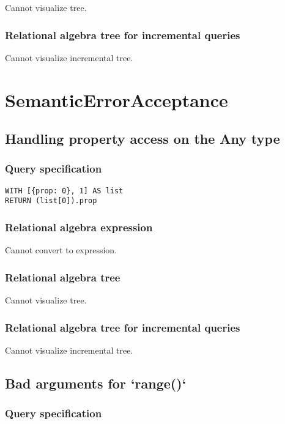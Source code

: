 Cannot visualize tree.

\subsubsection*{Relational algebra tree for incremental queries}

Cannot visualize incremental tree.

\section{SemanticErrorAcceptance}

\subsection{Handling property access on the Any type}

\subsubsection*{Query specification}

\begin{lstlisting}
WITH [{prop: 0}, 1] AS list
RETURN (list[0]).prop
\end{lstlisting}

\subsubsection*{Relational algebra expression}

Cannot convert to expression.

\subsubsection*{Relational algebra tree}

Cannot visualize tree.

\subsubsection*{Relational algebra tree for incremental queries}

Cannot visualize incremental tree.

\subsection{Bad arguments for `range()`}

\subsubsection*{Query specification}

